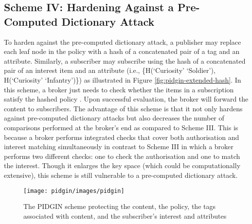 \documentclass[epsfig,a4paper,11pt,titlepage]{book}
\numberwithin{algorithm}{chapter}
\begin{document}
\subsection{Scheme IV: Hardening Against a Pre-Computed Dictionary Attack}
To harden against the pre-computed dictionary attack, a publisher may replace each leaf node in the policy with a hash of a concatenated pair of a tag and an attribute. Similarly, a subscriber may subscribe using the hash of a concatenated pair of an interest item and an attribute (i.e., \{H(`Curiosity'  `Soldier'), H(`Curiosity'  `Infantry')\}) as illustrated in Figure \ref{fig:pidgin-extended-hash}. In this scheme, a broker just needs to check whether the items in a subscription satisfy the hashed policy . Upon successful evaluation, the broker will forward the content to subscribers. The advantage of this scheme is that it not only hardens against pre-computed dictionary attacks but also decreases the number of comparisons performed at the broker's end as compared to Scheme III. This is because a broker performs integrated checks that cover both authorisation and interest matching simultaneously in contrast to Scheme III in which a broker performs two different checks: one to check the authorisation and one to match the interest. Though it enlarges the key space (which could be computationally extensive), this scheme is still vulnerable to a pre-computed dictionary attack.

\begin{figure} [htp]
\centering
\texttt{[image: pidgin/images/pidgin]}
\caption[The PIDGIN scheme protecting the content and policies]{The \gls{PIDGIN} scheme protecting the content, the policy, the tags associated with content, and the subscriber's interest and attributes}
\label{fig:pidgin-pidgin}
\end{figure}
\end{document}

